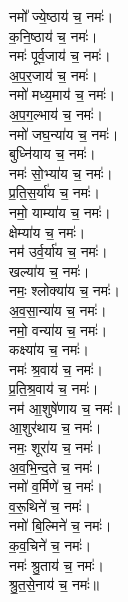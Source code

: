 \begin{multicols}{2}
\begin{flushleft}
नमो᳚ ज्ये॒ष्ठाय॑ च॒ नमः॑।\\
क॒नि॒ष्ठाय॑ च॒ नमः॑।\\
नमः॑ पूर्व॒जाय॑ च॒ नमः॑।\\
अ॒प॒र॒जाय॑ च॒ नमः॑।\\
नमो॑ मध्य॒माय॑ च॒ नमः॑।\\
अ॒प॒ग॒ल्भाय॑ च॒ नमः॑।\\
नमो॑ जघ॒न्या॑य च॒ नमः॑।\\
बुध्नि॑याय च॒ नमः॑।\\
नमः॑ सो॒भ्या॑य च॒ नमः॑।\\
प्र॒ति॒स॒र्या॑य च॒ नमः॑।\hfill {}\\
नमो॒ याम्या॑य च॒ नमः॑।\\
क्षेम्या॑य च॒ नमः॑।\\
नम॑ उर्व॒र्या॑य च॒ नमः॑।\\
खल्या॑य च॒ नमः॑।\\
नमः॒ श्लोक्या॑य च॒ नमः॑।\\
अ॒व॒सा॒न्या॑य च॒ नमः॑।\\
नमो॒ वन्या॑य च॒ नमः॑।\\
कक्ष्या॑य च॒ नमः॑।\\
नमः॑ श्र॒वाय॑ च॒ नमः॑।\\
प्र॒ति॒श्र॒वाय॑ च॒ नमः॑।\hfill {}\\
नम॑ आ॒शुषे॑णाय च॒ नमः॑।\\
आ॒शुर॑थाय च॒ नमः॑।\\
नमः॒ शूरा॑य च॒ नमः॑।\\
अ॒व॒भि॒न्द॒ते च॒ नमः॑।\\
नमो॑ व॒र्मिणे॑ च॒ नमः॑।\\
व॒रू॒थिने॑ च॒ नमः॑।\\
नमो॑ बि॒ल्मिने॑ च॒ नमः॑।\\
क॒व॒चिने॑ च॒ नमः॑।\\
नमः॑ श्रु॒ताय॑ च॒ नमः॑।\\
श्रु॒त॒से॒नाय॑ च॒ नमः॑॥\hfill {}\\


\end{flushleft}
\end{multicols}
